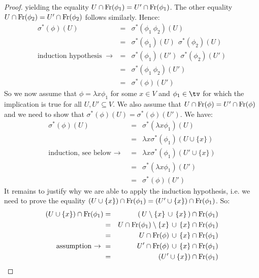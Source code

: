 \begin{proof}
    yielding the equality $U\cap\mbox{\rm Fr}(\phi_{1})=U'\cap\mbox{\rm Fr}(\phi_{1})$.
    The other equality $U\cap\mbox{\rm Fr}(\phi_{2})=U'\cap\mbox{\rm Fr}(\phi_{2})$ follows
    similarly. Hence:
        \begin{eqnarray*}\sigma^{*}(\phi)(U)
            &=&\sigma^{*}(\phi_{1}\ \phi_{2})(U)\\
            &=&\sigma^{*}(\phi_{1})(U)\ \ \sigma^{*}(\phi_{2})(U)\\
            \mbox{induction hypothesis $\ \rightarrow\ $}
            &=&\sigma^{*}(\phi_{1})(U')\ \ \sigma^{*}(\phi_{2})(U')\\
            &=&\sigma^{*}(\phi_{1}\ \phi_{2})(U')\\
            &=&\sigma^{*}(\phi)(U')
        \end{eqnarray*}
    So we now assume that $\phi=\lambda x\phi_{1}$ for some $x\in V$ and 
    $\phi_{1}\in\tv$ for which the implication is true for all $U,U'\subseteq V$.
    We also assume that $U\cap\mbox{\rm Fr}(\phi)=U'\cap\mbox{\rm Fr}(\phi)$ and we need to 
    show that $\sigma^{*}(\phi)(U)=\sigma^{*}(\phi)(U')$. We have:
        \begin{eqnarray*}\sigma^{*}(\phi)(U)
            &=&\sigma^{*}(\lambda x\phi_{1})(U)\\
            &=&\lambda x\sigma^{*}(\phi_{1})(U\cup\{x\})\\
            \mbox{induction, see below\ $\rightarrow$\ }
            &=&\lambda x\sigma^{*}(\phi_{1})(U'\cup\{x\})\\
            &=&\sigma^{*}(\lambda x\phi_{1})(U')\\
            &=&\sigma^{*}(\phi)(U')
        \end{eqnarray*}
    It remains to justify why we are able to apply the induction hypothesis, i.e.
    we need to prove the equality $(U\cup\{x\})\cap\mbox{\rm Fr}(\phi_{1})=
    (U'\cup\{x\})\cap\mbox{\rm Fr}(\phi_{1})$. So:
        \begin{eqnarray*}(U\cup\{x\})\cap\mbox{\rm Fr}(\phi_{1})
            &=&(\,U\setminus\{x\}\,\cup\,\{x\}\,)\cap\mbox{\rm Fr}(\phi_{1})\\
            &=&U\cap\mbox{\rm Fr}(\phi_{1})\setminus\{x\}\,
                \cup\,\{x\}\cap\mbox{\rm Fr}(\phi_{1})\\
            &=&U\cap\mbox{\rm Fr}(\phi)\,\cup\,\{x\}\cap\mbox{\rm Fr}(\phi_{1})\\
            \mbox{assumption\ $\rightarrow$\ }
            &=&U'\cap\mbox{\rm Fr}(\phi)\,\cup\,\{x\}\cap\mbox{\rm Fr}(\phi_{1})\\
            &=&(U'\cup\{x\})\cap\mbox{\rm Fr}(\phi_{1})
        \end{eqnarray*}
\end{proof}

